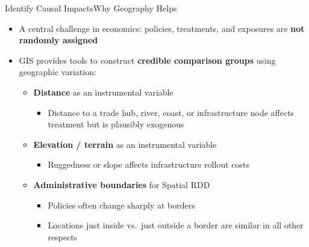 \documentclass[hyperref={pdfpagelabels=false}]{beamer}
\begin{document}
\begin{frame}{Identify Causal Impacts}{Why Geography Helps}
\begin{itemize}
	\item A central challenge in economics: policies, treatments, and exposures are \textbf{not randomly assigned}
	\vspace{0.2cm}
	\item GIS provides tools to construct \textbf{credible comparison groups} using geographic variation:
	\vspace{0.2cm}
	\begin{itemize}
		\item \textbf{Distance} as an instrumental variable
        		\vspace{0.2cm}
		\begin{itemize}
			\item Distance to a trade hub, river, coast, or infrastructure node affects treatment but is plausibly exogenous
		\end{itemize}
		\vspace{0.2cm}
		\item \textbf{Elevation / terrain} as an instrumental variable
        		\vspace{0.2cm}
		\begin{itemize}
			\item Ruggedness or slope affects infrastructure rollout costs
		\end{itemize}
		\vspace{0.2cm}
		\item \textbf{Administrative boundaries} for Spatial RDD
		\begin{itemize}
			\item Policies often change sharply at borders
            		\vspace{0.2cm}
			\item Locations just inside vs.\ just outside a border are similar in all other respects
		\end{itemize}
	\end{itemize}
\end{itemize}
\end{frame}
\end{document}
